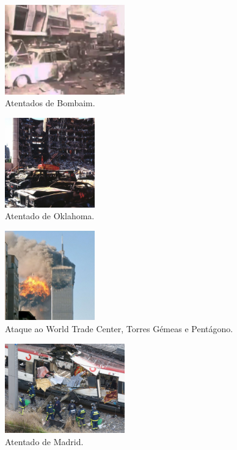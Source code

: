 \documentclass{report}
\begin{document}
 \begin{figure}[h]
 \center
 \includegraphics[height=110pt]{imagem3.pdf}
 \caption{Atentados de Bombaim.}
 \end{figure}

\begin{figure}[h]
 \center
 \includegraphics[height=110pt]{imagem4.pdf}
 \caption{Atentado de Oklahoma.}
 \end{figure}

\begin{figure}[h]
 \center
 \includegraphics[height=110pt]{imagem5.pdf}
 \caption{Ataque ao World Trade Center, Torres Gémeas e Pentágono.}
 \end{figure}

\begin{figure}[h]
 \center
 \includegraphics[height=110pt]{imagem6.pdf}
 \caption{Atentado de Madrid.}
 \end{figure}
\end{document}
